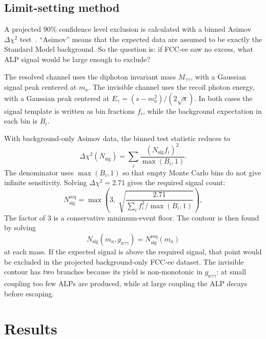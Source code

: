 \documentclass[12pt,a4paper]{article}
\begin{document}
\subsection{Limit-setting method}

A projected 90\% confidence level exclusion is calculated with a binned Asimov
$\Delta\chi^2$ test~\cite{Cowan2011}. ``Asimov'' means that the expected data
are assumed to be exactly the Standard Model background. So the question is:
if FCC-ee saw no excess, what ALP signal would be large enough to exclude?

The resolved channel uses the diphoton invariant mass $M_{\gamma\gamma}$, with
a Gaussian signal peak centered at $m_{a}$. The invisible channel uses the
recoil photon energy, with a Gaussian peak centered at
$E_\gamma=(s-m_{a}^2)/(2\sqrt{s})$. In both cases the signal template is written
as bin fractions $f_i$, while the background expectation in each bin is $B_i$.

With background-only Asimov data, the binned test statistic reduces to
\begin{equation}
    \Delta\chi^2(N_\mathrm{sig})
    =
    \sum_i
    \frac{(N_\mathrm{sig} f_i)^2}{\max(B_i,1)}.
    \label{eq:binned_dchi}
\end{equation}
The denominator uses $\max(B_i,1)$ so that empty Monte Carlo bins do not give
infinite sensitivity. Solving $\Delta\chi^2=2.71$ gives the required signal
count:
\begin{equation}
    N_\mathrm{sig}^\mathrm{req} =
    \max\!\left(3,\;
    \sqrt{\frac{2.71}{\displaystyle\sum_i f_i^2 / \max(B_i, 1)}}
    \right),
    \label{eq:nsig_req}
\end{equation}
The factor of 3 is a conservative minimum-event floor. The contour is then
found by solving
\begin{equation}
    N_\mathrm{sig}(m_{a},g_{a\gamma\gamma})
    =
    N_\mathrm{sig}^\mathrm{req}(m_{a})
    \label{eq:contour_condition}
\end{equation}
at each mass. If the expected signal is above the required signal, that point
would be excluded in the projected background-only FCC-ee dataset. The
invisible contour has two branches because its yield is non-monotonic in
$g_{a\gamma\gamma}$: at small coupling too few ALPs are produced, while at large
coupling the ALP decays before escaping.

\section{Results}
\label{sec:results}
\end{document}
